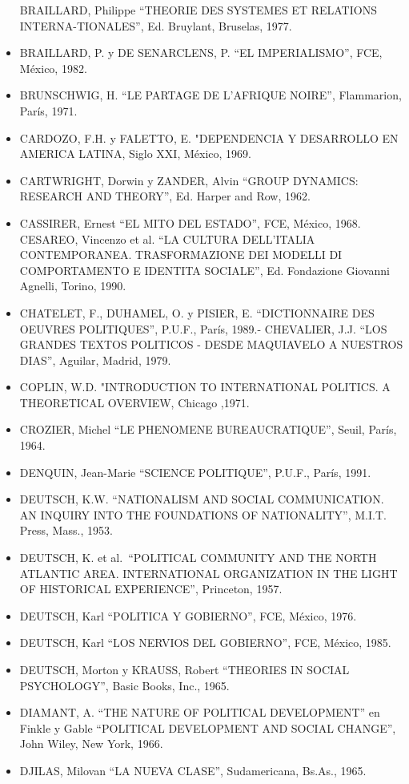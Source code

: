 \documentclass[
]{book}
\begin{document}
\begin{itemize}
  BRAILLARD, Philippe ``THEORIE DES SYSTEMES ET RELATIONS INTERNA-TIONALES'',
  Ed. Bruylant, Bruselas, 1977.
\item
  BRAILLARD, P. y DE SENARCLENS, P. ``EL IMPERIALISMO'', FCE, México, 1982.
\item
  BRUNSCHWIG, H. ``LE PARTAGE DE L'AFRIQUE NOIRE'', Flammarion, París, 1971.
\item
  CARDOZO, F.H. y FALETTO, E. "DEPENDENCIA Y DESARROLLO EN AMERICA LATINA,
  Siglo XXI, México, 1969.
\item
  CARTWRIGHT, Dorwin y ZANDER, Alvin ``GROUP DYNAMICS: RESEARCH AND THEORY'',
  Ed. Harper and Row, 1962.
\item
  CASSIRER, Ernest ``EL MITO DEL ESTADO'', FCE, México, 1968. CESAREO, Vincenzo et al.
  ``LA CULTURA DELL'ITALIA CONTEMPORANEA. TRASFORMAZIONE DEI MODELLI DI
  COMPORTAMENTO E IDENTITA SOCIALE'', Ed. Fondazione Giovanni Agnelli, Torino, 1990.
\item
  CHATELET, F., DUHAMEL, O. y PISIER, E. ``DICTIONNAIRE DES OEUVRES POLITIQUES'',
  P.U.F., París, 1989.- CHEVALIER, J.J. ``LOS GRANDES TEXTOS POLITICOS - DESDE MAQUIAVELO A
  NUESTROS DIAS'', Aguilar, Madrid, 1979.
\item
  COPLIN, W.D. "INTRODUCTION TO INTERNATIONAL POLITICS. A THEORETICAL
  OVERVIEW, Chicago ,1971.
\item
  CROZIER, Michel ``LE PHENOMENE BUREAUCRATIQUE'', Seuil, París, 1964.
\item
  DENQUIN, Jean-Marie ``SCIENCE POLITIQUE'', P.U.F., París, 1991.
\item
  DEUTSCH, K.W. ``NATIONALISM AND SOCIAL COMMUNICATION. AN INQUIRY INTO
  THE FOUNDATIONS OF NATIONALITY'', M.I.T. Press, Mass., 1953.
\item
  DEUTSCH, K. et al.~``POLITICAL COMMUNITY AND THE NORTH ATLANTIC AREA.
  INTERNATIONAL ORGANIZATION IN THE LIGHT OF HISTORICAL EXPERIENCE'',
  Princeton, 1957.
\item
  DEUTSCH, Karl ``POLITICA Y GOBIERNO'', FCE, México, 1976.
\item
  DEUTSCH, Karl ``LOS NERVIOS DEL GOBIERNO'', FCE, México, 1985.
\item
  DEUTSCH, Morton y KRAUSS, Robert ``THEORIES IN SOCIAL PSYCHOLOGY'', Basic Books,
  Inc., 1965.
\item
  DIAMANT, A. ``THE NATURE OF POLITICAL DEVELOPMENT'' en Finkle y Gable
  ``POLITICAL DEVELOPMENT AND SOCIAL CHANGE'', John Wiley, New York, 1966.
\item
  DJILAS, Milovan ``LA NUEVA CLASE'', Sudamericana, Bs.As., 1965.

\end{itemize}
\end{document}
